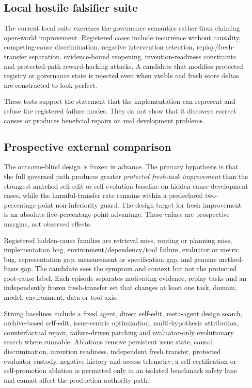 \subsection{Local hostile falsifier suite}

The current local suite exercises the governance semantics rather than claiming open-world improvement. Registered cases include recurrence without causality, competing-cause discrimination, negative intervention retention, replay/fresh-transfer separation, evidence-bound reopening, invention-readiness constraints and protected-path reward-hacking attacks. A candidate that modifies protected registry or governance state is rejected even when visible and fresh score deltas are constructed to look perfect.

These tests support the statement that the implementation can represent and refuse the registered failure modes. They do not show that it discovers correct causes or produces beneficial repairs on real development problems.

\subsection{Prospective external comparison}

The outcome-blind design is frozen in advance. The primary hypothesis is that the full governed path produces greater \emph{protected fresh-task improvement} than the strongest matched self-edit or self-evolution baseline on hidden-cause development cases, while the harmful-transfer rate remains within a predeclared two-percentage-point non-inferiority guard. The design target for fresh improvement is an absolute five-percentage-point advantage. These values are prospective margins, not observed effects.

Registered hidden-cause families are retrieval miss, routing or planning miss, implementation bug, environment/dependency/tool failure, evaluator or metric bug, representation gap, measurement or specification gap, and genuine method-basis gap. The candidate sees the symptom and context but not the protected root-cause label. Each episode separates motivating evidence, replay tasks and an independently frozen fresh-transfer set that changes at least one task, domain, model, environment, data or tool axis.

Strong baselines include a fixed agent, direct self-edit, meta-agent design search, archive-based self-edit, issue-centric optimization, multi-hypothesis attribution, counterfactual repair, failure-driven patching and evaluator-only evolutionary search where runnable. Ablations remove persistent issue state, causal discrimination, invention readiness, independent fresh transfer, protected evaluator custody, negative history and access telemetry; a self-certification or self-promotion ablation is permitted only in an isolated benchmark safety lane and cannot affect the production authority path.

